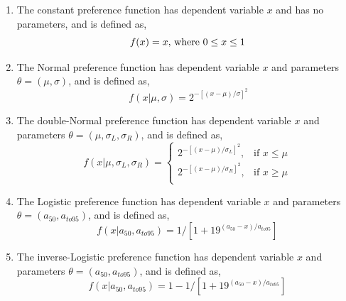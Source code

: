 \begin{enumerate}
\item The constant preference function has dependent variable $x$ and has no parameters, and is defined as,
\begin{equation}
f(x)=x$, where $0 \leq x \leq 1
\end{equation}

\item The Normal preference function has dependent variable $x$ and parameters $\theta = (\mu,\sigma)$, and is defined as, 
\begin{equation}\
f(x | \mu, \sigma) = 2^{-[(x- \mu)/\sigma ]^2} 
\end{equation}
 
\item The double-Normal preference function has dependent variable $x$ and parameters $\theta=(\mu,\sigma_L,\sigma_R)$, and is defined as,
\begin{equation}
  f(x | \mu, \sigma_L, \sigma_R) = \begin{cases}
    2^{-[(x- \mu)/\sigma_L ]^2}, & \text{if $x \leq \mu$} \\
    2^{-[(x- \mu)/\sigma_R ]^2}, & \text{if $x \ge \mu$}\\
  \end{cases}
\end{equation} 

\item The Logistic preference function  has dependent variable $x$ and parameters $\theta = (a_{50},a_{to95})$, and is defined as,
\begin{equation}
  f(x | a_{50}, a_{to95}) = 1 / [1+19^{(a_{50}-x)/a_{to95}}]
\end{equation}

\item The inverse-Logistic preference function has dependent variable $x$ and parameters $\theta = (a_{50},a_{to95})$, and is defined as,
\begin{equation}
  f(x | a_{50}, a_{to95}) =1- 1 / [1+19^{(a_{50}-x)/a_{to95}}]
\end{equation}


\end{enumerate}

